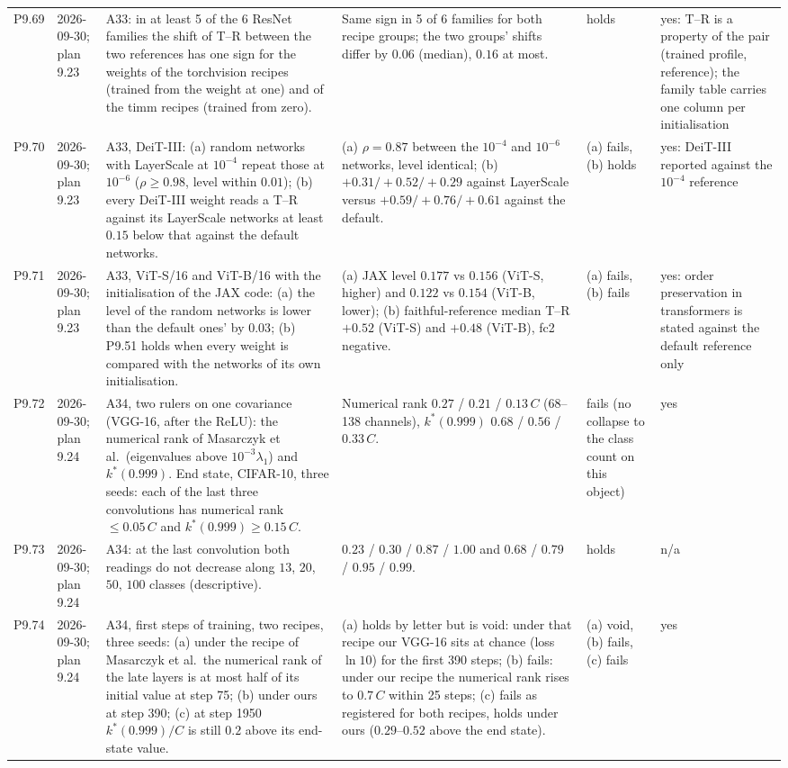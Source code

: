 \begin{longtable}{p{1.1cm}p{1.4cm}p{6.2cm}p{4.6cm}p{2.0cm}p{1.6cm}}
P9.69 & 2026-09-30; plan 9.23 & A33: in at least 5 of the 6 ResNet families the shift of T--R between the two references has one sign for the weights of the torchvision recipes (trained from the weight at one) and of the timm recipes (trained from zero). & Same sign in 5 of 6 families for both recipe groups; the two groups' shifts differ by $0.06$ (median), $0.16$ at most. & holds & yes: T--R is a property of the pair (trained profile, reference); the family table carries one column per initialisation \\
P9.70 & 2026-09-30; plan 9.23 & A33, DeiT-III: (a) random networks with LayerScale at $10^{-4}$ repeat those at $10^{-6}$ ($\rho \ge 0.98$, level within $0.01$); (b) every DeiT-III weight reads a T--R against its LayerScale networks at least $0.15$ below that against the default networks. & (a) $\rho = 0.87$ between the $10^{-4}$ and $10^{-6}$ networks, level identical; (b) $+0.31/+0.52/+0.29$ against LayerScale versus $+0.59/+0.76/+0.61$ against the default. & (a) fails, (b) holds & yes: DeiT-III reported against the $10^{-4}$ reference \\
P9.71 & 2026-09-30; plan 9.23 & A33, ViT-S/16 and ViT-B/16 with the initialisation of the JAX code: (a) the level of the random networks is lower than the default ones' by $0.03$; (b) P9.51 holds when every weight is compared with the networks of its own initialisation. & (a) JAX level $0.177$ vs $0.156$ (ViT-S, higher) and $0.122$ vs $0.154$ (ViT-B, lower); (b) faithful-reference median T--R $+0.52$ (ViT-S) and $+0.48$ (ViT-B), fc2 negative. & (a) fails, (b) fails & yes: order preservation in transformers is stated against the default reference only \\
P9.72 & 2026-09-30; plan 9.24 & A34, two rulers on one covariance (VGG-16, after the ReLU): the numerical rank of Masarczyk et al.\ (eigenvalues above $10^{-3}\lambda_1$) and $k^*(0.999)$. End state, CIFAR-10, three seeds: each of the last three convolutions has numerical rank $\le 0.05\,C$ and $k^*(0.999) \ge 0.15\,C$. & Numerical rank $0.27$ / $0.21$ / $0.13\,C$ (68--138 channels), $k^*(0.999)$ $0.68$ / $0.56$ / $0.33\,C$. & fails (no collapse to the class count on this object) & yes \\
P9.73 & 2026-09-30; plan 9.24 & A34: at the last convolution both readings do not decrease along $13$, $20$, $50$, $100$ classes (descriptive). & $0.23$ / $0.30$ / $0.87$ / $1.00$ and $0.68$ / $0.79$ / $0.95$ / $0.99$. & holds & n/a \\
P9.74 & 2026-09-30; plan 9.24 & A34, first steps of training, two recipes, three seeds: (a) under the recipe of Masarczyk et al.\ the numerical rank of the late layers is at most half of its initial value at step 75; (b) under ours at step 390; (c) at step 1950 $k^*(0.999)/C$ is still $0.2$ above its end-state value. & (a) holds by letter but is void: under that recipe our VGG-16 sits at chance (loss $\ln 10$) for the first 390 steps; (b) fails: under our recipe the numerical rank rises to $0.7\,C$ within 25 steps; (c) fails as registered for both recipes, holds under ours ($0.29$--$0.52$ above the end state). & (a) void, (b) fails, (c) fails & yes \\

\end{longtable}
